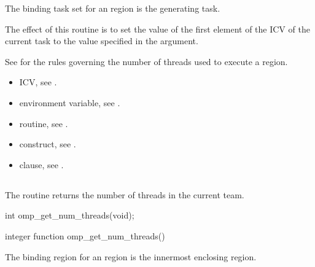 \binding
The binding task set for an  region is the generating task.

\effect
The effect of this routine is to set the value of the first element of the  ICV 
of the current task to the value specified in the argument. 

See  
for the rules governing the number of threads used to 
execute a  region. 

\crossreferences
\begin{itemize}
\item {} ICV, see 
.

\item {} environment variable, see 
.

\item {} routine, see 
.

\item {} construct, see 
.

\item {} clause, see 
.
\end{itemize}









\subsection{}
\label{subsec:omp_get_num_threads}
\summary
The  routine returns the number of threads in the current 
team.
\format
\ccppspecificstart
\begin{boxedcode}
int omp\_get\_num\_threads(void); 
\end{boxedcode}
\ccppspecificend

\pagebreak
\fortranspecificstart
\begin{boxedcode}
integer function omp\_get\_num\_threads()
\end{boxedcode}
\fortranspecificend

\binding
The binding region for an  region is the innermost enclosing 
 region.

